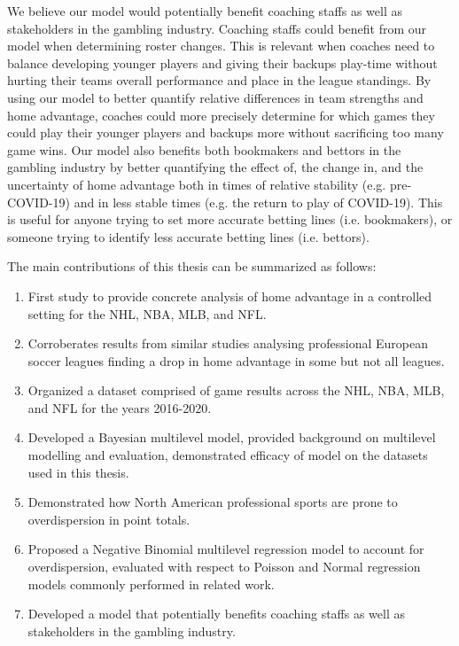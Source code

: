 We believe our model would potentially benefit coaching staffs as well as stakeholders in the gambling industry. Coaching staffs could benefit from our model when determining roster changes. This is relevant when coaches need to balance developing younger players and giving their backups play-time without hurting their teams overall performance and place in the league standings. By using our model to better quantify relative differences in team strengths and home advantage, coaches could more precisely determine for which games they could play their younger players and backups more without sacrificing too many game wins. Our model also benefits both bookmakers and bettors in the gambling industry by better quantifying the effect of, the change in, and the uncertainty of home advantage both in times of relative stability (e.g. pre-COVID-19) and in less stable times (e.g. the return to play of COVID-19). This is useful for anyone trying to set more accurate betting lines (i.e. bookmakers), or someone trying to identify less accurate betting lines (i.e. bettors).

The main contributions of this thesis can be summarized as follows:
\begin{enumerate}
	\item First study to provide concrete analysis of home advantage in a controlled setting for the NHL, NBA, MLB, and NFL.
	\item Corroberates results from similar studies analysing professional European soccer leagues finding a drop in home advantage in some but not all leagues.
	\item Organized a dataset comprised of game results across the NHL, NBA, MLB, and NFL for the years 2016-2020.
	\item Developed a Bayesian multilevel model, provided background on multilevel modelling and evaluation, demonstrated efficacy of model on the datasets used in this thesis.
	\item Demonstrated how North American professional sports are prone to overdispersion in point totals.
	\item Proposed a Negative Binomial multilevel regression model to account for overdispersion, evaluated with respect to Poisson and Normal regression models commonly performed in related work.
	\item Developed a model that potentially benefits coaching staffs as well as stakeholders in the gambling industry.
\end{enumerate}

